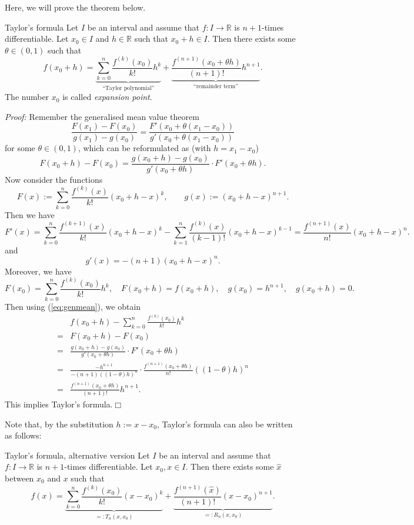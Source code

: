 

Here, we will prove the theorem below.

\begin{Theorem}{Taylor's formula}
    Let $I$ be an interval and assume that $f:I\to\mathbb{R}$ is $n+1$-times differentiable. Let $x_0\in I$ and $h\in\mathbb{R}$ such that $x_0+h\in I$. 
Then there exists some $\theta\in(0,1)$ such that
\[f(x_0+h)=\underbrace{\sum_{k=0}^n\frac{f^{(k)}(x_0)}{k!}h^k}_{\text{``Taylor polynomial''}}+\underbrace{\frac{f^{(n+1)}(x_0+\theta h)}{(n+1)!}h^{n+1}}_{\text{``remainder term''}}.\]
The number $x_0$ is called \emph{expansion point}.
\end{Theorem}
{\em Proof:} Remember the generalised mean value theorem
\[\frac{F(x_1)-F(x_0)}{g(x_1)-g(x_0)}=\frac{F'(x_0+\theta(x_1-x_0))}{g'(x_0+\theta(x_1-x_0))}\]
for some $\theta\in(0,1)$,
which can be reformulated as (with $h=x_1-x_0$)
\begin{equation}
F(x_0+h)-F(x_0)=\frac{g(x_0+h)-g(x_0)}{g'(x_0+\theta h)}\cdot F'(x_0+\theta h).\label{eq:genmean}
\end{equation}
Now consider the functions
\[F(x):=\sum_{k=0}^n\frac{f^{(k)}(x)}{k!}(x_0+h-x)^k,\qquad g(x):=(x_0+h-x)^{n+1}.\]
Then we have
\[F'(x)=\sum_{k=0}^n\frac{f^{(k+1)}(x)}{k!}(x_0+h-x)^k-\sum_{k=1}^n\frac{f^{(k)}(x)}{(k-1)!}(x_0+h-x)^{k-1}=\frac{f^{(n+1)}(x)}{n!}(x_0+h-x)^{n}.\]
and
\[g'(x)=-(n+1)(x_0+h-x)^{n}.\]
Moreover, we have
\[F(x_0)=\sum_{k=0}^n\frac{f^{(k)}(x_{0})}{k!}h^k,\quad F(x_0+h)=f(x_0+h),\quad g(x_0)=h^{n+1},\quad g(x_0+h)=0.\]
Then using (\ref{eq:genmean}), we obtain
\[
\begin{aligned}
&f(x_0+h)- \sum_{k=0}^n\frac{f^{(k)}(x_0)}{k!}h^k\\
=&F(x_0+h)-F(x_0)\\
=&\frac{g(x_0+h)-g(x_0)}{g'(x_0+\theta h)}\cdot F'(x_0+\theta h)\\
=&\frac{-h^{n+1}}{-(n+1)((1-\theta) h)^{n}}\cdot
\frac{f^{(n+1)}(x_0+\theta h)}{n!}((1-\theta) h)^{n}\\
=&\frac{f^{(n+1)}(x_0+\theta h)}{(n+1)!}h^{n+1}.
\end{aligned}
\]
This implies Taylor's formula.$\Box$

Note that, by the substitution $h:=x-x_0$, Taylor's formula can also be written as follows:
\begin{Theorem}{Taylor's formula{,} alternative version}
    Let $I$ be an interval and assume that $f:I\to\mathbb{R}$ is $n+1$-times differentiable. Let $x_0,x\in I$. Then there exists some $\hat{x}$ between $x_0$ and $x$ 
such that
\[f(x)=\underbrace{\sum_{k=0}^n\frac{f^{(k)}(x_0)}{k!}(x-x_0)^k}_{=:T_n(x,x_0)}+\underbrace{\frac{f^{(n+1)}(\hat{x})}{(n+1)!}(x-x_0)^{n+1}}_{=:R_n(x,x_0)}.\]
\end{Theorem}

